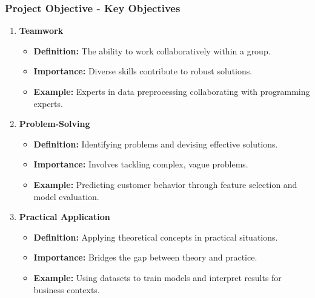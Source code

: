 \documentclass{beamer}
\begin{document}
\begin{frame}[fragile]
    \frametitle{Project Objective - Key Objectives}
    \begin{enumerate}
        \item \textbf{Teamwork}
            \begin{itemize}
                \item \textbf{Definition:} The ability to work collaboratively within a group.
                \item \textbf{Importance:} Diverse skills contribute to robust solutions.
                \item \textbf{Example:} Experts in data preprocessing collaborating with programming experts.
            \end{itemize}
        
        \item \textbf{Problem-Solving}
            \begin{itemize}
                \item \textbf{Definition:} Identifying problems and devising effective solutions.
                \item \textbf{Importance:} Involves tackling complex, vague problems.
                \item \textbf{Example:} Predicting customer behavior through feature selection and model evaluation.
            \end{itemize}

        \item \textbf{Practical Application}
            \begin{itemize}
                \item \textbf{Definition:} Applying theoretical concepts in practical situations.
                \item \textbf{Importance:} Bridges the gap between theory and practice.
                \item \textbf{Example:} Using datasets to train models and interpret results for business contexts.
            \end{itemize}
    \end{enumerate}
\end{frame}
\end{document}
